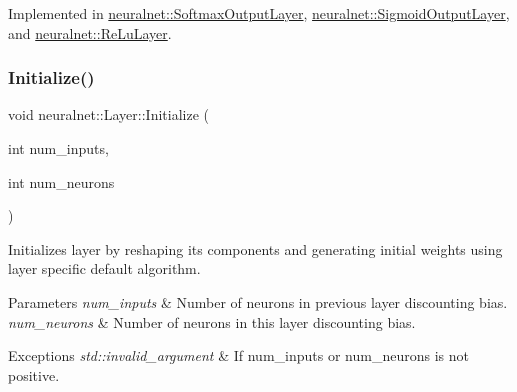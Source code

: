 Implemented in \hyperlink{classneuralnet_1_1SoftmaxOutputLayer_acb4f6f8739a3dedde111f11b548899f7}{neuralnet\+::\+Softmax\+Output\+Layer}, \hyperlink{classneuralnet_1_1SigmoidOutputLayer_aaaa8a49435e351e688699a3d27db5c9a}{neuralnet\+::\+Sigmoid\+Output\+Layer}, and \hyperlink{classneuralnet_1_1ReLuLayer_a97dd16df35d4fb139e955d9a9acc2284}{neuralnet\+::\+Re\+Lu\+Layer}.

\mbox{\label{classneuralnet_1_1Layer_a722c2673491edfb9c30c0f7b2fcca29a}} 
\subsubsection{\texorpdfstring{Initialize()}{Initialize()}\hspace{0.1cm}{\footnotesize\ttfamily [1/2]}}
{\footnotesize\ttfamily void neuralnet\+::\+Layer\+::\+Initialize (\begin{DoxyParamCaption}\item[{int}]{num\+\_\+inputs,  }\item[{int}]{num\+\_\+neurons }\end{DoxyParamCaption})\hspace{0.3cm}{\ttfamily [virtual]}}



Initializes layer by reshaping its components and generating initial weights using layer specific default algorithm. 


\begin{DoxyParams}{Parameters}
{\em num\+\_\+inputs} & Number of neurons in previous layer discounting bias. \\
\hline
{\em num\+\_\+neurons} & Number of neurons in this layer discounting bias. \\
\hline
\end{DoxyParams}

\begin{DoxyExceptions}{Exceptions}
{\em std\+::invalid\+\_\+argument} & If num\+\_\+inputs or num\+\_\+neurons is not positive. \\
\hline
\end{DoxyExceptions}
\mbox{\label{classneuralnet_1_1Layer_a10b9155017dca618ca37ce3aa4546831}} 
